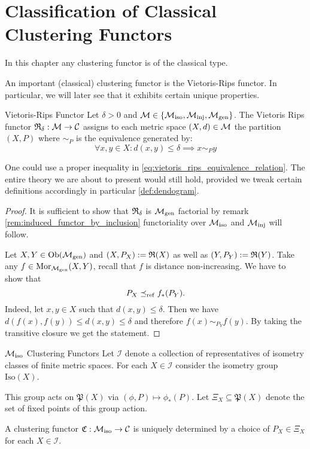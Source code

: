 \chapter{Classification of Classical Clustering Functors}
In this chapter any clustering functor is of the classical type.

An important (classical) clustering functor is the Vietoris-Rips functor.
In particular, we will later see that it exhibits certain unique properties.

\begin{defprop}{Vietoris-Rips Functor}{}
    Let $\delta > 0$ and $\mathcal{M} \in \{{\mathcal{M}_\mathrm{iso}}, {\mathcal{M}_\mathrm{inj}}, {\mathcal{M}_\mathrm{gen}}\}$. The Vietoris Rips functor $\mathfrak{R}_\delta: \mathcal{M} \to \mathcal{C}$ assigns to each metric space $(X,d) \in \mathcal{M}$ the partition $(X,P)$ where $\sim_P$ is the equivalence generated by:
    \begin{equation}
        \label{eq:vietoris_rips_equivalence_relation}
        \forall x,y \in X: d(x,y) \leq \delta \implies x \sim_P y
    \end{equation}
\end{defprop}

One could use a proper inequality in \eqref{eq:vietoris_rips_equivalence_relation}. The entire theory we are about to present would still hold, provided we tweak certain definitions accordingly in particular \ref{def:dendogram}.

\begin{proof}
It is sufficient to show that $\mathfrak{R}_\delta$ is ${\mathcal{M}_\mathrm{gen}}$ factorial by remark \ref{rem:induced_functor_by_inclusion} functoriality over ${\mathcal{M}_\mathrm{iso}}$ and ${\mathcal{M}_\mathrm{inj}}$ will follow.

Let $X,Y \in \mathrm {Ob}({\mathcal{M}_\mathrm{gen}})$ and $(X,P_X) := \mathfrak{R}(X)$ as well as $(Y,P_Y) := \mathfrak{R}(Y)$.
Take any $f \in \mathrm {Mor}_{\mathcal{M}_\mathrm{gen}}(X,Y)$, recall that $f$ is distance non-increasing.
We have to show that 
$$P_X \preceq_\mathrm{ref} f_*(P_Y).$$
Indeed, let $x,y \in X$ such that $d(x,y) \leq \delta$.
Then we have $d(f(x), f(y)) \leq d(x,y) \leq \delta$ and therefore $f(x) \sim_{P_Y} f(y)$.
By taking the transitive closure we get the statement.
\end{proof}

\begin{myremark}{${\mathcal{M}_\mathrm{iso}}$ Clustering Functors \cite{Carlsson2010}}{}
Let $\mathcal{I}$ denote a collection of representatives of isometry classes of finite metric spaces.
For each $X \in \mathcal{I}$ consider the isometry group $\mathrm{Iso}(X)$. \par

\medskip This group acts on $\mathfrak{P}(X)$ via $(\phi, P) \mapsto \phi_*(P)$.
Let $\Xi_X \subseteq \mathfrak{P}(X)$ denote the set of fixed points of this group action. \par

\medskip A clustering functor $\mathfrak{C}: {\mathcal{M}_\mathrm{iso}} \to \mathcal{C}$ is uniquely determined by a choice of $P_X \in \Xi_X$ for each $X \in \mathcal{I}$.
\end{myremark}

